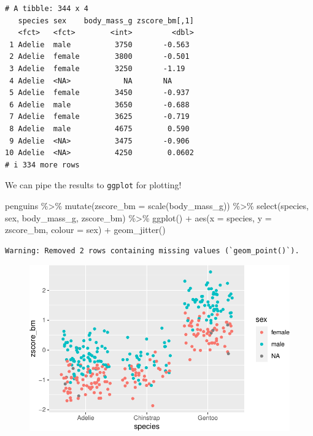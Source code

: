\documentclass[
  letterpaper,
  DIV=11,
  numbers=noendperiod]{scrreprt}
\newenvironment{Shaded}{\begin{snugshade}}{\end{snugshade}}
\newcommand{\AttributeTok}[1]{\textcolor[rgb]{0.40,0.45,0.13}{#1}}
\newcommand{\FunctionTok}[1]{\textcolor[rgb]{0.28,0.35,0.67}{#1}}
\newcommand{\NormalTok}[1]{\textcolor[rgb]{0.00,0.23,0.31}{#1}}
\newcommand{\SpecialCharTok}[1]{\textcolor[rgb]{0.37,0.37,0.37}{#1}}
\begin{document}
\begin{verbatim}
# A tibble: 344 x 4
   species sex    body_mass_g zscore_bm[,1]
   <fct>   <fct>        <int>         <dbl>
 1 Adelie  male          3750       -0.563 
 2 Adelie  female        3800       -0.501 
 3 Adelie  female        3250       -1.19  
 4 Adelie  <NA>            NA       NA     
 5 Adelie  female        3450       -0.937 
 6 Adelie  male          3650       -0.688 
 7 Adelie  female        3625       -0.719 
 8 Adelie  male          4675        0.590 
 9 Adelie  <NA>          3475       -0.906 
10 Adelie  <NA>          4250        0.0602
# i 334 more rows
\end{verbatim}

We can pipe the results to \texttt{ggplot} for plotting!

\begin{Shaded}
\begin{Highlighting}[]
\NormalTok{penguins }\SpecialCharTok{\%\textgreater{}\%} 
  \FunctionTok{mutate}\NormalTok{(}\AttributeTok{zscore\_bm =} \FunctionTok{scale}\NormalTok{(body\_mass\_g)) }\SpecialCharTok{\%\textgreater{}\%} 
  \FunctionTok{select}\NormalTok{(species, sex, body\_mass\_g, zscore\_bm) }\SpecialCharTok{\%\textgreater{}\%} 
  \FunctionTok{ggplot}\NormalTok{() }\SpecialCharTok{+} \FunctionTok{aes}\NormalTok{(}\AttributeTok{x =}\NormalTok{ species, }\AttributeTok{y =}\NormalTok{ zscore\_bm, }\AttributeTok{colour =}\NormalTok{ sex) }\SpecialCharTok{+} 
    \FunctionTok{geom\_jitter}\NormalTok{()}
\end{Highlighting}
\end{Shaded}

\begin{verbatim}
Warning: Removed 2 rows containing missing values (`geom_point()`).
\end{verbatim}

\begin{figure}[H]

{\centering \includegraphics{./03-wrangling_files/figure-pdf/unnamed-chunk-15-1.pdf}

}

\end{figure}
\end{document}
